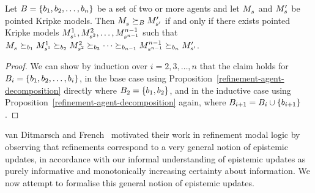 \begin{corollary}
Let $\agentsB = \{\agentB_1, \agentB_2, \dots, \agentB_n\}$ be a set of two or more agents and let $\kPModel{\kStateS}$ and $\kPModelP{\kStateS}$ be pointed Kripke models.
Then $\kPModel{\kStateS} \simulatesBs \kPModelP{\kStateSP}$ if and only if there exists pointed Kripke models $\kPModel[1]{\kStateS[1]}, \kPModel[2]{\kStateS[2]}, \dots, \kPModel[n - 1]{\kStateS[n - 1]}$ such that $\kPModel{\kStateS} \simulates[\agentB_1] \kPModel[1]{\kStateS[1]} \simulates[\agentB_2] \kPModel[2]{\kStateS[2]} \simulates[\agentB_3] \cdots \simulates[\agentB_{n - 1}] \kPModel[n - 1]{\kStateS[n - 1]} \simulates[\agentB_n] \kPModelP{\kStateSP}$.
\end{corollary}

\begin{proof}
We can show by induction over $i = 2, 3, \dots, n$ that the claim holds for $\agentsB_i = \{\agentB_1, \agentB_2, \dots, \agentB_i\}$, 
in the base case using Proposition~\ref{refinement-agent-decomposition} directly where $\agentsB_2 = \{\agentB_1, \agentB_2\}$, and
in the inductive case using Proposition~\ref{refinement-agent-decomposition} again, where $\agentsB_{i + 1} = \agentsB_i \cup \{\agentB_{i + 1}\}$.
\end{proof}

van Ditmarsch and French~\cite{vanditmarsch:2009} motivated their work in refinement modal logic by observing that refinements correspond to a very general notion of epistemic updates, in accordance with our informal understanding of epistemic updates as purely informative and monotonically increasing certainty about information.
We now attempt to formalise this general notion of epistemic updates.

